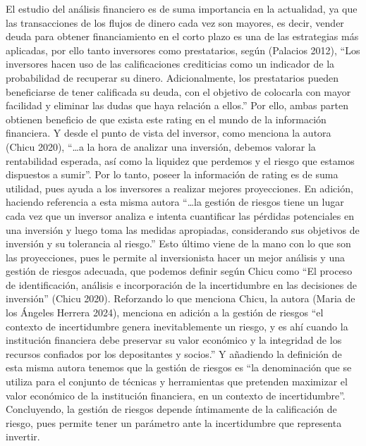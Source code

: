 \documentclass[
  letterpaper,
  DIV=11,
  numbers=noendperiod]{scrreprt}
\begin{document}
El estudio del análisis financiero es de suma importancia en la
actualidad, ya que las transacciones de los flujos de dinero cada vez
son mayores, es decir, vender deuda para obtener financiamiento en el
corto plazo es una de las estrategias más aplicadas, por ello tanto
inversores como prestatarios, según (Palacios 2012), ``Los inversores
hacen uso de las calificaciones crediticias como un indicador de la
probabilidad de recuperar su dinero. Adicionalmente, los prestatarios
pueden beneficiarse de tener calificada su deuda, con el objetivo de
colocarla con mayor facilidad y eliminar las dudas que haya relación a
ellos.'' Por ello, ambas parten obtienen beneficio de que exista este
rating en el mundo de la información financiera. Y desde el punto de
vista del inversor, como menciona la autora (Chicu 2020), ``\ldots a la
hora de analizar una inversión, debemos valorar la rentabilidad
esperada, así como la liquidez que perdemos y el riesgo que estamos
dispuestos a sumir''. Por lo tanto, poseer la información de rating es
de suma utilidad, pues ayuda a los inversores a realizar mejores
proyecciones. En adición, haciendo referencia a esta misma autora
``\ldots la gestión de riesgos tiene un lugar cada vez que un inversor
analiza e intenta cuantificar las pérdidas potenciales en una inversión
y luego toma las medidas apropiadas, considerando sus objetivos de
inversión y su tolerancia al riesgo.'' Esto último viene de la mano con
lo que son las proyecciones, pues le permite al inversionista hacer un
mejor análisis y una gestión de riesgos adecuada, que podemos definir
según Chicu como ``El proceso de identificación, análisis e
incorporación de la incertidumbre en las decisiones de inversión''
(Chicu 2020). Reforzando lo que menciona Chicu, la autora (Maria de los
Ángeles Herrera 2024), menciona en adición a la gestión de riesgos ``el
contexto de incertidumbre genera inevitablemente un riesgo, y es ahí
cuando la institución financiera debe preservar su valor económico y la
integridad de los recursos confiados por los depositantes y socios.'' Y
añadiendo la definición de esta misma autora tenemos que la gestión de
riesgos es ``la denominación que se utiliza para el conjunto de técnicas
y herramientas que pretenden maximizar el valor económico de la
institución financiera, en un contexto de incertidumbre''. Concluyendo,
la gestión de riesgos depende íntimamente de la calificación de riesgo,
pues permite tener un parámetro ante la incertidumbre que representa
invertir.

\end{document}
